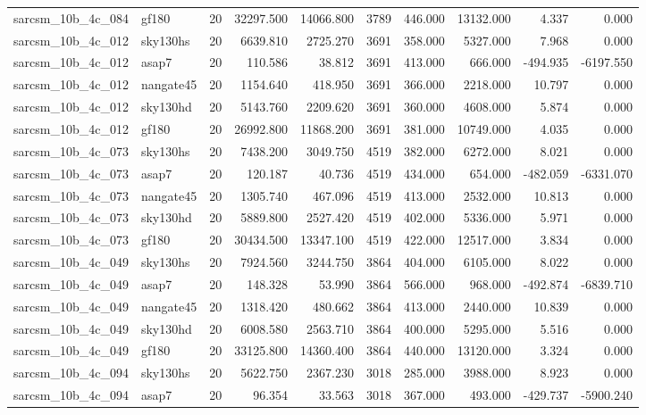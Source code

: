 \documentclass{article}
\begin{document}
\begin{longtable}{llrrrrrrrr}
sarcsm\_10b\_4c\_084 & gf180 & 20 & 32297.500 & 14066.800 & 3789 & 446.000 & 13132.000 & 4.337 & 0.000 \\
sarcsm\_10b\_4c\_012 & sky130hs & 20 & 6639.810 & 2725.270 & 3691 & 358.000 & 5327.000 & 7.968 & 0.000 \\
sarcsm\_10b\_4c\_012 & asap7 & 20 & 110.586 & 38.812 & 3691 & 413.000 & 666.000 & -494.935 & -6197.550 \\
sarcsm\_10b\_4c\_012 & nangate45 & 20 & 1154.640 & 418.950 & 3691 & 366.000 & 2218.000 & 10.797 & 0.000 \\
sarcsm\_10b\_4c\_012 & sky130hd & 20 & 5143.760 & 2209.620 & 3691 & 360.000 & 4608.000 & 5.874 & 0.000 \\
sarcsm\_10b\_4c\_012 & gf180 & 20 & 26992.800 & 11868.200 & 3691 & 381.000 & 10749.000 & 4.035 & 0.000 \\
sarcsm\_10b\_4c\_073 & sky130hs & 20 & 7438.200 & 3049.750 & 4519 & 382.000 & 6272.000 & 8.021 & 0.000 \\
sarcsm\_10b\_4c\_073 & asap7 & 20 & 120.187 & 40.736 & 4519 & 434.000 & 654.000 & -482.059 & -6331.070 \\
sarcsm\_10b\_4c\_073 & nangate45 & 20 & 1305.740 & 467.096 & 4519 & 413.000 & 2532.000 & 10.813 & 0.000 \\
sarcsm\_10b\_4c\_073 & sky130hd & 20 & 5889.800 & 2527.420 & 4519 & 402.000 & 5336.000 & 5.971 & 0.000 \\
sarcsm\_10b\_4c\_073 & gf180 & 20 & 30434.500 & 13347.100 & 4519 & 422.000 & 12517.000 & 3.834 & 0.000 \\
sarcsm\_10b\_4c\_049 & sky130hs & 20 & 7924.560 & 3244.750 & 3864 & 404.000 & 6105.000 & 8.022 & 0.000 \\
sarcsm\_10b\_4c\_049 & asap7 & 20 & 148.328 & 53.990 & 3864 & 566.000 & 968.000 & -492.874 & -6839.710 \\
sarcsm\_10b\_4c\_049 & nangate45 & 20 & 1318.420 & 480.662 & 3864 & 413.000 & 2440.000 & 10.839 & 0.000 \\
sarcsm\_10b\_4c\_049 & sky130hd & 20 & 6008.580 & 2563.710 & 3864 & 400.000 & 5295.000 & 5.516 & 0.000 \\
sarcsm\_10b\_4c\_049 & gf180 & 20 & 33125.800 & 14360.400 & 3864 & 440.000 & 13120.000 & 3.324 & 0.000 \\
sarcsm\_10b\_4c\_094 & sky130hs & 20 & 5622.750 & 2367.230 & 3018 & 285.000 & 3988.000 & 8.923 & 0.000 \\
sarcsm\_10b\_4c\_094 & asap7 & 20 & 96.354 & 33.563 & 3018 & 367.000 & 493.000 & -429.737 & -5900.240 \\

\end{longtable}
\end{document}
